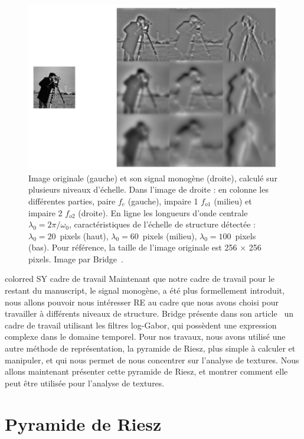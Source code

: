 \begin{figure}
    \centering
    \includegraphics[width=.75\textwidth]{resources/images/cameraman_monogenic}
    \caption[Signal monogène calculé pour plusieurs niveaux d'échelle]{Image originale (gauche) et son signal monogène (droite), calculé sur plusieurs niveaux d'échelle. Dans l'image de droite : en colonne les différentes parties, paire $f_e$ (gauche), impaire 1 $f_{o1}$ (milieu) et impaire 2 $f_{o2}$ (droite). En ligne les longueurs d'onde centrale $\lambda_0 = 2\pi/\omega_0$, caractéristiques de l'échelle de structure détectée : $\lambda_0 = 20$~pixels (haut), $\lambda_0 = 60$~pixels (milieu), $\lambda_0 = 100$~pixels (bas). Pour référence, la taille de l'image originale est 256 $\times$ 256 pixels. Image par Bridge~\cite{bridge_introduction_2018}.}
    \label{fig:cameraman-monogenic}
\end{figure}



\bigskip
{color{red} SY cadre de travail}
Maintenant que notre cadre de travail pour le restant du manuscript, le signal monogène, a été plus formellement introduit, nous allons pouvoir nous intéresser RE au cadre que nous avons choisi pour travailler à différents niveaux de structure. Bridge présente dans son article~\cite{bridge_introduction_2018} un cadre de travail utilisant les filtres log-Gabor, qui possèdent une expression complexe dans le domaine temporel. Pour nos travaux, nous avons utilisé une autre méthode de représentation, la pyramide de Riesz, plus simple à calculer et manipuler, et qui nous permet de nous concentrer sur l'analyse de textures. Nous allons maintenant présenter cette pyramide de Riesz, et montrer comment elle peut être utilisée pour l'analyse de textures.

\section{Pyramide de Riesz}

